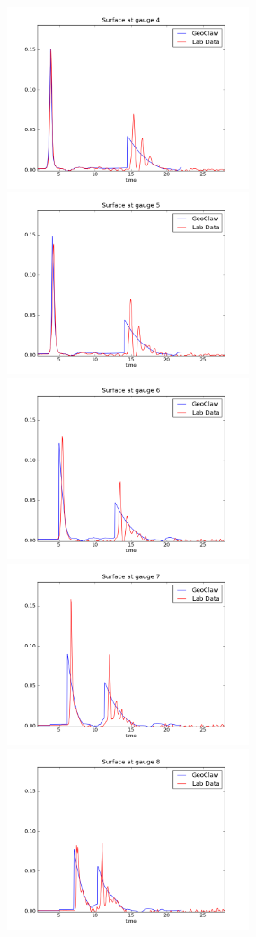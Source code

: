 \begin{figure}[ht]
\hfil\includegraphics[width=2.8in]{bp5/CaseC/gauge0004fig300.png}\hfil
\hfil\includegraphics[width=2.8in]{bp5/CaseC/gauge0005fig300.png}\hfil
\vskip 5pt
\hfil\includegraphics[width=2.8in]{bp5/CaseC/gauge0006fig300.png}\hfil
\hfil\includegraphics[width=2.8in]{bp5/CaseC/gauge0007fig300.png}\hfil
\vskip 5pt
\hfil\includegraphics[width=2.8in]{bp5/CaseC/gauge0008fig300.png}\hfil

\end{figure}
